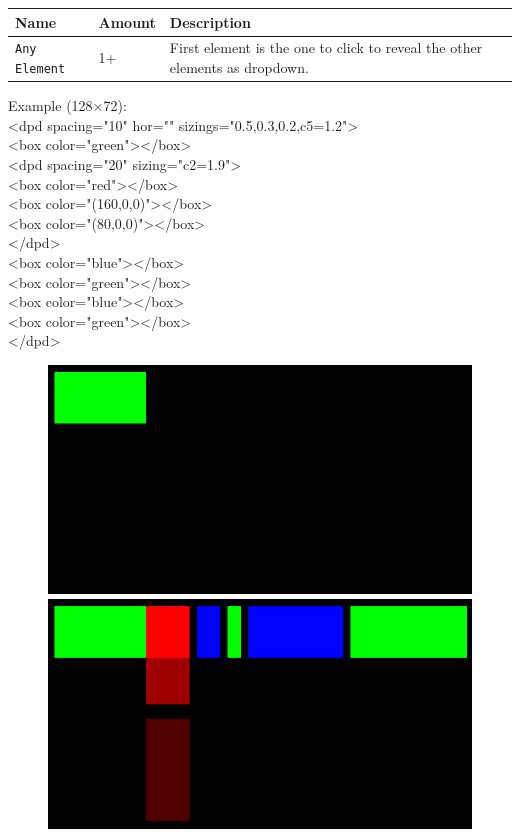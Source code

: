 \documentclass[a4paper,11pt]{article}
\begin{document}
\renewcommand{\arraystretch}{1.3}
\begin{tcolorbox}[colback=white, colframe=black!75, title=Children]
\begin{tabularx}{\linewidth}{p{50pt}|p{110pt}|X}
\textbf{Name} & \textbf{Amount} & \textbf{Description}\\
\hline
\texttt{Any Element} & 1+ & First element is the one to click to reveal the other elements as dropdown.\\
\end{tabularx}
\end{tcolorbox}

Example (128×72):\\
<dpd spacing="10" hor="" sizings="0.5,0.3,0.2,c5=1.2">\\
<box color="green"></box>\\
<dpd spacing="20" sizing="c2=1.9">\\
<box color="red"></box>\\
<box color="(160,0,0)"></box>\\
<box color="(80,0,0)"></box>\\
</dpd>\\
<box color="blue"></box>\\
<box color="green"></box>\\
<box color="blue"></box>\\
<box color="green"></box>\\
</dpd>

\begin{figure}[h]
    \centering
    \includegraphics[width=0.45\linewidth]{images/dropdown1.png}
    \includegraphics[width=0.45\linewidth]{images/dropdown2.png}
\end{figure}
\end{document}
